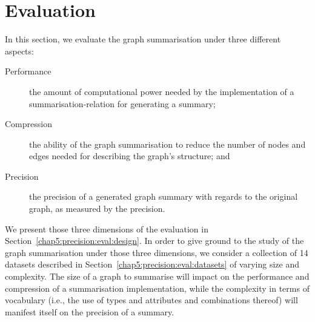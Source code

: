 \section{Evaluation}
\label{chap5:precision:eval}

In this section, we evaluate the graph summarisation under three different aspects:
\begin{description}
	\item[Performance] the amount of computational power needed by the implementation of a \gls{summarisation-relation} for generating a summary;
	\item[Compression] the ability of the graph summarisation to reduce the number of nodes and edges needed for describing the graph's structure; and
	\item[Precision] the precision of a generated graph summary with regards to the original graph, as measured by the \gls{precision}.
\end{description}
We present those three dimensions of the evaluation in Section~\ref{chap5:precision:eval:design}.
In order to give ground to the study of the graph summarisation under those three dimensions, we consider a collection of 14 datasets described in Section~\ref{chap5:precision:eval:datasets} of varying size and complexity. The size of a graph to summarise will impact on the performance and compression of a summarisation implementation, while the complexity in terms of vocabulary (i.e., the use of \gls{types} and \gls{attributes} and combinations thereof) will manifest itself on the precision of a summary.\\

